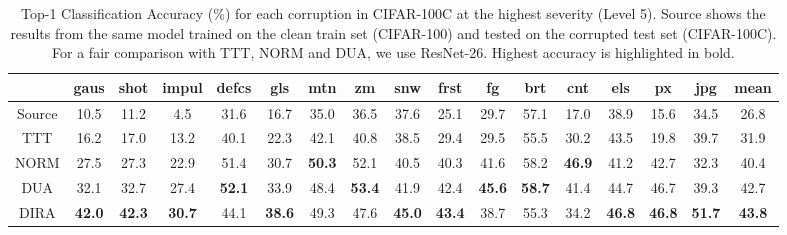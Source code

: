\begin{table*}[]
    \centering
    \begin{tabular}{c|c c c c c c c c c c c c c c c|c}
                 & gaus & shot & impul & defcs & gls & mtn & zm & snw & frst & fg & brt & cnt & els & px &jpg & mean \\\hline
Source  & 10.5 & 11.2 & 4.5 & 31.6 & 16.7 & 35.0 & 36.5 & 37.6 & 25.1 & 29.7 & 57.1 & 17.0 & 38.9 & 15.6 & 34.5 & 26.8 \\
TTT  & 16.2 & 17.0 & 13.2 & 40.1 & 22.3 & 42.1 & 40.8 & 38.5 & 29.4 & 29.5 & 55.5 & 30.2 & 43.5 & 19.8 & 39.7 & 31.9\\
NORM  & 27.5 & 27.3 & 22.9 & 51.4 & 30.7 & \textbf{50.3}& 52.1 & 40.5 & 40.3 & 41.6 & 58.2 & \textbf{46.9} & 41.2 & 42.7 & 32.3 & 40.4\\
DUA  & 32.1 & 32.7 & 27.4 & \textbf{52.1} & 33.9 & 48.4 & \textbf{53.4} & 41.9 & 42.4 & \textbf{45.6} & \textbf{58.7} & 41.4 & 44.7 & 46.7 & 39.3  & 42.7\\
DIRA  & \textbf{42.0} & \textbf{42.3} & \textbf{30.7} & 44.1 & \textbf{38.6} & 49.3 & 47.6 & \textbf{45.0} & \textbf{43.4} & 38.7 & 55.3 & 34.2 & \textbf{46.8} & \textbf{46.8} & \textbf{51.7} & \textbf{43.8} \\ 
    \end{tabular}
    \caption{Top-1 Classification Accuracy (\%) for each corruption in CIFAR-100C at the highest severity (Level 5). Source shows the results from the same model trained on the clean train set (CIFAR-100) and tested on the corrupted test set (CIFAR-100C). For a fair comparison with TTT, NORM and DUA, we use ResNet-26. Highest accuracy is highlighted in bold.}
    \label{tab:SOTA_CIFAR-100C_results}
\end{table*}


